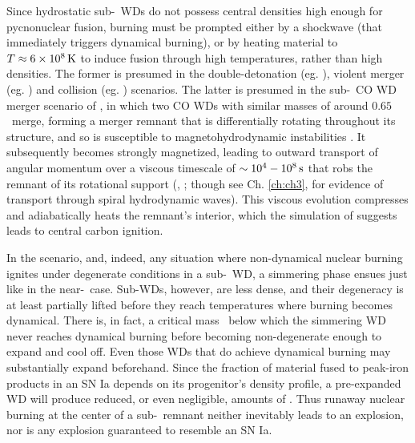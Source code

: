 Since hydrostatic sub-\Mch\ WDs do not possess central densities high enough for pycnonuclear fusion, burning must be prompted either by a shockwave (that immediately triggers dynamical burning), or by heating material to $T\approx6\times10^8\,\mathrm{K}$ to induce fusion through high temperatures, rather than high densities.  The former is presumed in the double-detonation (eg. \citealt{fink+07, woosk11, pakm+13, shenm14}), violent merger (eg. \citealt{pakm+10}) and collision (eg. \citealt{loreig10}) scenarios.  The latter is presumed in the sub-\Mch\ CO WD merger scenario of \citeal{vkercj10}, in which two CO WDs with similar masses of around $0.65$ \Msun\ merge, forming a merger remnant that is differentially rotating throughout its structure, and so is susceptible to magnetohydrodynamic instabilities \citep{shen+12, ji+13}.  It subsequently becomes strongly magnetized, leading to outward transport of angular momentum over a viscous timescale of $\sim10^4 - 10^8\,\mathrm{s}$ that robs the remnant of its rotational support (\citeal{vkercj10}, \citealt{shen+12}; though see Ch. \ref{ch:ch3}, \citealt{kash+15} for evidence of transport through spiral hydrodynamic waves).  This viscous evolution compresses and adiabatically heats the remnant's interior, which the simulation of \cite{ji+13} suggests leads to central carbon ignition.

In the \citeal{vkercj10} scenario, and, indeed, any situation where non-dynamical nuclear burning ignites under degenerate conditions in a sub-\Mch\ WD, a simmering phase ensues just like in the near-\Mch\ case.  Sub-\Mch WDs, however, are less dense, and their degeneracy is at least partially lifted before they reach temperatures where burning becomes dynamical.  There is, in fact, a critical mass \Mcrit\ below which the simmering WD never reaches dynamical burning before becoming non-degenerate enough to expand and cool off.  Even those WDs that do achieve dynamical burning may substantially expand beforehand.  Since the fraction of material fused to peak-iron products in an SN Ia depends on its progenitor's density profile, a pre-expanded WD will produce reduced, or even negligible, amounts of \Ni.  Thus runaway nuclear burning at the center of a sub-\Mch\ remnant neither inevitably leads to an explosion, nor is any explosion guaranteed to resemble an SN Ia.

